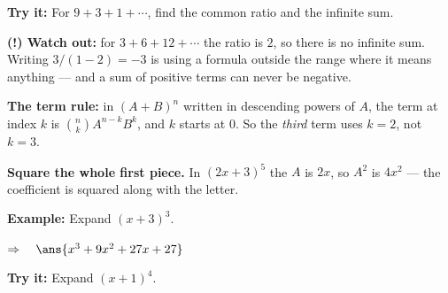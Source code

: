 \documentclass[12pt]{article}
\begin{document}
\begin{tryitbox}
\textbf{Try it:} \quad For $9 + 3 + 1 + \cdots$, find the common ratio and the infinite sum.\\[2pt]
\end{tryitbox}

\begin{watchoutbox}
\textbf{(!) Watch out:} for $3 + 6 + 12 + \cdots$ the ratio is $2$, so there is no infinite sum. Writing $3/(1-2) = -3$ is using a formula outside the range where it means anything --- and a sum of positive terms can never be negative.
\end{watchoutbox}


\begin{formulabox}
\textbf{The term rule:} in $(A + B)^n$ written in descending powers of $A$, the term at index
$k$ is $\binom{n}{k} A^{n-k} B^{k}$, and $k$ starts at $0$. So the \emph{third} term uses
$k = 2$, not $k = 3$.\par
\textbf{Square the whole first piece.} In $(2x + 3)^5$ the $A$ is $2x$, so $A^2$ is $4x^2$ ---
the coefficient is squared along with the letter.
\end{formulabox}

\begin{examplebox}
\textbf{Example:} \quad Expand $(x + 3)^3$.

$\Rightarrow\quad \ans{x^3 + 9x^2 + 27x + 27}$
\end{examplebox}

\begin{tryitbox}
\textbf{Try it:} \quad Expand $(x + 1)^4$.\\[2pt]
\end{tryitbox}
\end{document}

